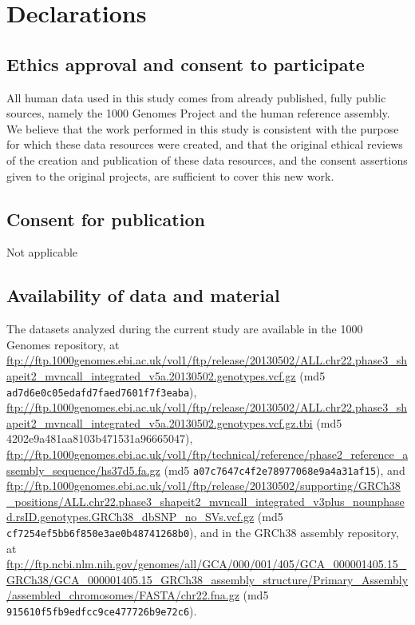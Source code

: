 \section{Declarations}

\subsection{Ethics approval and consent to participate}
All human data used in this study comes from already published, fully public sources, namely the 1000 Genomes Project and the human reference assembly. We believe that the work performed in this study is consistent with the purpose for which these data resources were created, and that the original ethical reviews of the creation and publication of these data resources, and the consent assertions given to the original projects, are sufficient to cover this new work.

\subsection{Consent for publication}
Not applicable

\subsection{Availability of data and material}
\begin{sloppypar}
The datasets analyzed during the current study are available in the 1000 Genomes repository, at \url{ftp://ftp.1000genomes.ebi.ac.uk/vol1/ftp/release/20130502/ALL.chr22.phase3_shapeit2_mvncall_integrated_v5a.20130502.genotypes.vcf.gz} (md5 \texttt{ad7d6e0c05edafd7faed7601f7f3eaba}), \url{ftp://ftp.1000genomes.ebi.ac.uk/vol1/ftp/release/20130502/ALL.chr22.phase3_shapeit2_mvncall_integrated_v5a.20130502.genotypes.vcf.gz.tbi} (md5 4202e9a481aa8103b471531a96665047), \url{ftp://ftp.1000genomes.ebi.ac.uk/vol1/ftp/technical/reference/phase2_reference_assembly_sequence/hs37d5.fa.gz} (md5 \texttt{a07c7647c4f2e78977068e9a4a31af15}), and \url{ftp://ftp.1000genomes.ebi.ac.uk/vol1/ftp/release/20130502/supporting/GRCh38_positions/ALL.chr22.phase3_shapeit2_mvncall_integrated_v3plus_nounphased.rsID.genotypes.GRCh38_dbSNP_no_SVs.vcf.gz} (md5 \texttt{cf7254ef5bb6f850e3ae0b48741268b0}), and in the GRCh38 assembly repository, at \url{ftp://ftp.ncbi.nlm.nih.gov/genomes/all/GCA/000/001/405/GCA_000001405.15_GRCh38/GCA_000001405.15_GRCh38_assembly_structure/Primary_Assembly/assembled_chromosomes/FASTA/chr22.fna.gz} (md5 \texttt{915610f5fb9edfcc9ce477726b9e72c6}).
\end{sloppypar}

